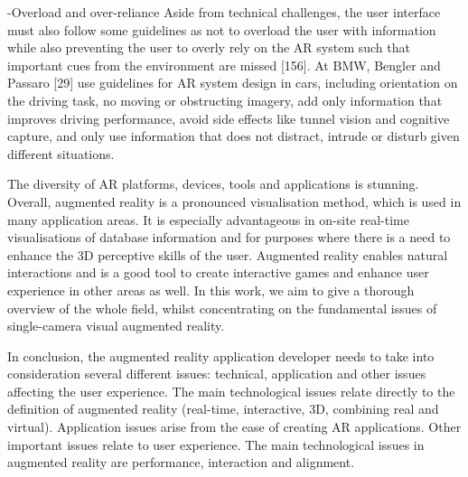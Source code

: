 -Overload and over-reliance
Aside from technical challenges, the user interface must
also follow some guidelines as not to overload the user with
information while also preventing the user to overly rely on
the AR system such that important cues from the environment
are missed [156]. At BMW, Bengler and Passaro [29] use
guidelines for AR system design in cars, including orientation
on the driving task, no moving or obstructing imagery,
add only information that improves driving performance,
avoid side effects like tunnel vision and cognitive capture,
and only use information that does not distract, intrude or
disturb given different situations.


The diversity of AR platforms, devices, tools and applications is stunning. Overall,
augmented reality is a pronounced visualisation method, which is used in many
application areas. It is especially advantageous in on-site real-time visualisations
of database information and for purposes where there is a need to enhance the
3D perceptive skills of the user. Augmented reality enables natural interactions
and is a good tool to create interactive games and enhance user experience in
other areas as well. In this work, we aim to give a thorough overview of the whole
field, whilst concentrating on the fundamental issues of single-camera visual augmented
reality.


In conclusion, the augmented reality application developer needs to take into consideration several different issues: technical, application and other issues affecting the user experience. The main technological issues relate directly to the definition of augmented reality (real-time, interactive, 3D, combining real and virtual). Application issues arise from the ease of creating AR applications. Other important issues relate to user experience. The main technological issues in augmented reality are performance, interaction and alignment.

